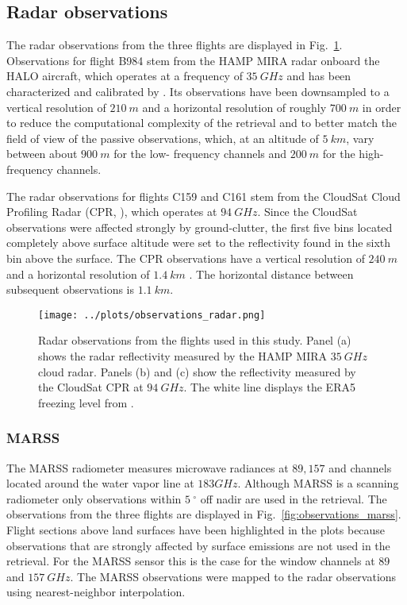 \documentclass[journal abbreviation, manuscript]{copernicus}
\begin{document}
\subsection{Radar observations}

The radar observations from the three flights are displayed in
Fig.~\ref{fig:observations_radar}. Observations for flight B984 stem from the
HAMP MIRA radar \citep{mech14} onboard the HALO aircraft, which operates at a
frequency of $35\ \unit{GHz}$ and has been characterized and calibrated by
\citep{ewald19}. Its observations have been downsampled to a vertical resolution
of $210\ \unit{m}$ and a horizontal resolution of roughly $700\ \unit{m}$ in
order to reduce the computational complexity of the retrieval and to better
match the field of view of the passive observations, which, at an altitude of
$5\ \unit{km}$, vary between about $900\ \unit{m}$ for the low- frequency
channels and $200\ \unit{m}$ for the high-frequency channels.

The radar observations for flights C159 and C161 stem from the CloudSat Cloud
Profiling Radar (CPR, \citet{tanelli08}), which operates at $94\ \unit{GHz}$.
Since the CloudSat observations were affected strongly by ground-clutter, the
first five bins located completely above surface altitude were set to the
reflectivity found in the sixth bin above the surface. The CPR observations
have a vertical resolution of $240\ \unit{m}$ and a horizontal resolution of
$1.4\ \unit{km}$ . The horizontal distance between subsequent observations is
$1.1\ \unit{km}$.


\begin{figure}[h!]
  \centering
  \texttt{[image: ../plots/observations\_radar.png]}
  \caption{Radar observations from the flights used in this study. Panel (a)
    shows the radar reflectivity measured by the HAMP MIRA $35\ \unit{GHz}$
    cloud radar. Panels (b) and (c) show the reflectivity measured by the
    CloudSat CPR at $94\ \unit{GHz}$. The white line displays the ERA5 freezing
    level from \citet{era5}. }
  \label{fig:observations_radar}
\end{figure}

\subsubsection{MARSS}

The MARSS radiometer measures microwave radiances at $89, 157$ and channels
located around the water vapor line at $183 \unit{GHz}$. Although MARSS is a
scanning radiometer only observations within $5\ \unit{^\circ}$ off nadir are
used in the retrieval. The observations from the three flights are displayed in
Fig.~\ref{fig:observations_marss}. Flight sections above land surfaces have been
highlighted in the plots because observations that are strongly affected by
surface emissions are not used in the retrieval. For the MARSS sensor this is
the case for the window channels at $89$ and $157\ \unit{GHz}$. The MARSS
observations were mapped to the radar observations using nearest-neighbor
interpolation.
\end{document}
